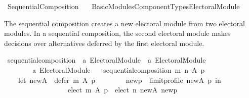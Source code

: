 %
\begin{isabellebody}%
%
%
\isadelimdocument
\isanewline
%
\endisadelimdocument
%
\isatagdocument
\isanewline
\isanewline
%
\isamarkuptrue%
%
\endisatagdocument
{\isafolddocument}%
%
\isadelimdocument
%
\endisadelimdocument
%
\isadelimtheory
%
\endisadelimtheory
%
\isatagtheory
{}\isamarkupfalse%
\ Sequential{\isacharunderscore}{\kern0pt}Composition\isanewline
\ \ \ {\isachardoublequoteopen}Basic{\isacharunderscore}{\kern0pt}Modules{\isacharslash}{\kern0pt}Component{\isacharunderscore}{\kern0pt}Types{\isacharslash}{\kern0pt}Electoral{\isacharunderscore}{\kern0pt}Module{\isachardoublequoteclose}\isanewline
{}%
\endisatagtheory
{\isafoldtheory}%
%
\isadelimtheory
%
\endisadelimtheory
%
\begin{isamarkuptext}%
The sequential composition creates a new electoral module from
two electoral modules. In a sequential composition, the second
electoral module makes decisions over alternatives deferred by
the first electoral module.%
\end{isamarkuptext}\isamarkuptrue%
%
\isadelimdocument
%
\endisadelimdocument
%
\isatagdocument
%
\isamarkuptrue%
%
\endisatagdocument
{\isafolddocument}%
%
\isadelimdocument
%
\endisadelimdocument
{}\isamarkupfalse%
\ sequential{\isacharunderscore}{\kern0pt}composition\ {\isacharcolon}{\kern0pt}{\isacharcolon}{\kern0pt}\ {\isachardoublequoteopen}{\isacharprime}{\kern0pt}a\ Electoral{\isacharunderscore}{\kern0pt}Module\ {\isasymRightarrow}\ {\isacharprime}{\kern0pt}a\ Electoral{\isacharunderscore}{\kern0pt}Module\ {\isasymRightarrow}\isanewline
\ \ \ \ \ \ \ \ {\isacharprime}{\kern0pt}a\ Electoral{\isacharunderscore}{\kern0pt}Module{\isachardoublequoteclose}\ \isanewline
\ \ {\isachardoublequoteopen}sequential{\isacharunderscore}{\kern0pt}composition\ m\ n\ A\ p\ {\isacharequal}{\kern0pt}\isanewline
\ \ \ \ {\isacharparenleft}{\kern0pt}let\ new{\isacharunderscore}{\kern0pt}A\ {\isacharequal}{\kern0pt}\ defer\ m\ A\ p{\isacharsemicolon}{\kern0pt}\isanewline
\ \ \ \ \ \ \ \ new{\isacharunderscore}{\kern0pt}p\ {\isacharequal}{\kern0pt}\ limit{\isacharunderscore}{\kern0pt}profile\ new{\isacharunderscore}{\kern0pt}A\ p\ in\ {\isacharparenleft}{\kern0pt}\isanewline
\ \ \ \ \ \ \ \ \ \ \ \ \ \ \ \ \ \ {\isacharparenleft}{\kern0pt}elect\ m\ A\ p{\isacharparenright}{\kern0pt}\ {\isasymunion}\ {\isacharparenleft}{\kern0pt}elect\ n\ new{\isacharunderscore}{\kern0pt}A\ new{\isacharunderscore}{\kern0pt}p{\isacharparenright}{\kern0pt}{\isacharcomma}{\kern0pt}\isanewline

\end{isabellebody}
